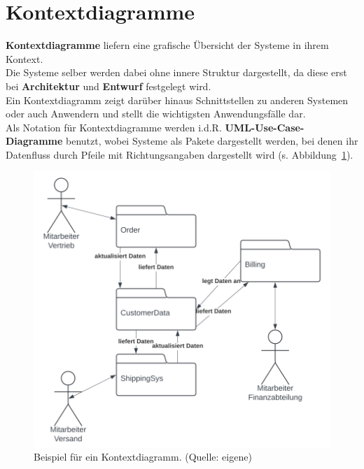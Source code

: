 \section{Kontextdiagramme}

\textbf{Kontextdiagramme} liefern eine grafische Übersicht der Systeme in ihrem Kontext.\\
Die Systeme selber werden dabei ohne innere Struktur dargestellt, da diese erst bei \textbf{Architektur} und \textbf{Entwurf} festgelegt wird.\\
Ein Kontextdiagramm zeigt darüber hinaus Schnittstellen zu anderen Systemen oder auch Anwendern und stellt die wichtigsten Anwendungsfälle dar.\\

\noindent
Als Notation für Kontextdiagramme werden i.d.R. \textbf{UML-Use-Case-Diagramme} benutzt, wobei Systeme als Pakete dargestellt werden, bei denen ihr Datenfluss durch Pfeile mit Richtungsangaben dargestellt wird (s. Abbildung~\ref{fig:usecaseexample}).

\begin{figure}
    \centering
    \includegraphics[scale=0.4]{chapters/Requirements Engineering/img/usecaseexample}
    \caption{Beispiel für ein Kontextdiagramm. (Quelle: eigene)}
    \label{fig:usecaseexample}
\end{figure}
